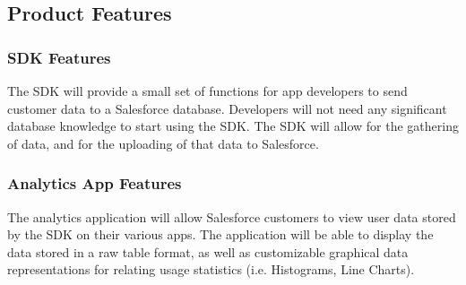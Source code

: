 \documentclass[12pt,oneside,letterpaper]{article}
\begin{document}
\subsection{Product Features}
\subsubsection{SDK Features}
The SDK will provide a small set of functions for app developers to send customer data to a Salesforce database. Developers will not need any significant database knowledge to start using the SDK. The SDK will allow for the gathering of data, and for the uploading of that data to Salesforce. 
\subsubsection{Analytics App Features}
The analytics application will allow Salesforce customers to view user data stored by the SDK on their various apps. The application will be able to display the data stored in a raw table format, as well as customizable graphical data representations for relating usage statistics (i.e. Histograms, Line Charts). 
\end{document}

